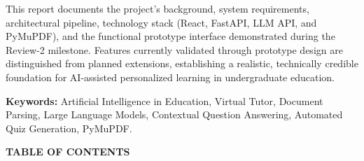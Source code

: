 \documentclass[11pt,a4paper]{report}
\begin{document}
This report documents the project's background, system requirements, architectural pipeline, technology stack (React, FastAPI, LLM API, and PyMuPDF), and the functional prototype interface demonstrated during the Review-2 milestone. Features currently validated through prototype design are distinguished from planned extensions, establishing a realistic, technically credible foundation for AI-assisted personalized learning in undergraduate education.

\vspace{0.6cm}
\noindent\textbf{Keywords:} Artificial Intelligence in Education, Virtual Tutor, Document Parsing, Large Language Models, Contextual Question Answering, Automated Quiz Generation, PyMuPDF.
\clearpage

\thispagestyle{plain}
\begin{center}
    {\Large\bfseries\color{icemNavy} TABLE OF CONTENTS}
\end{center}
\vspace{0.2cm}
\end{document}
